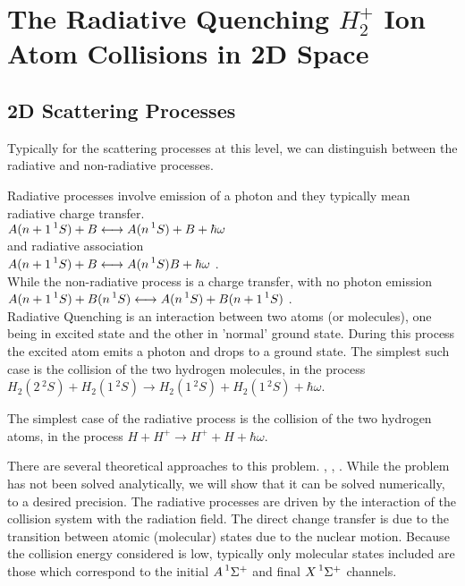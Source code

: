 \chapter{The Radiative Quenching \texorpdfstring{$ H_2^+ $}{$H_2^+$}  Ion Atom Collisions in 2D Space} 

\section{2D Scattering Processes}

Typically for the scattering processes at this level, we can distinguish between the radiative and non-radiative processes. 

Radiative processes involve emission of a photon and they typically mean radiative charge transfer. \\

$ A(n+1\prescript{1}{}S) + B \longleftrightarrow A(n\prescript{1}{}S) + B + \hbar\omega $ \\
and radiative association \\
$ A(n+1\prescript{1}{}S) + B \longleftrightarrow A(n\prescript{1}{}S)B + \hbar\omega $ .\\
While the non-radiative process is a charge transfer, with no photon emission \\
$ A(n+1\prescript{1}{}S) + B(n\prescript{1}{}S) \longleftrightarrow  A(n\prescript{1}{}S) + B(n+1\prescript{1}{}S) $ .\\

Radiative Quenching is an interaction between two atoms (or molecules), one being in excited state and the other in 'normal' ground state. During this process the excited atom emits a photon and drops to a ground state.
The simplest such case is the collision of the two hydrogen molecules, in the process $ H_2(2\,{}^2\!S) + H_2(1\,{}^2\!S) \rightarrow H_2(1\,{}^2\!S) + H_2(1\,{}^2\!S) + \hbar\omega $.

The simplest case of the radiative process is the collision of the two hydrogen atoms, in the process $ H + H^+ \rightarrow H^+ + H + \hbar\omega $.

There are several theoretical approaches to this problem. \cite{RadQuench1}, \cite{RadQuench2}, \cite{Zygelman88}. While the problem has not been solved analytically, we will show that it can be solved numerically, to a desired precision. The radiative processes are driven by the interaction of the collision system with the radiation field. The direct change transfer is due to the transition between atomic (molecular) states due to the nuclear motion. Because the collision energy considered is low, typically only molecular states included are those which correspond to the initial $ A \prescript{1}{}\Sigma^+ $  and final $ X \prescript{1}{}\Sigma^+ $ channels.

